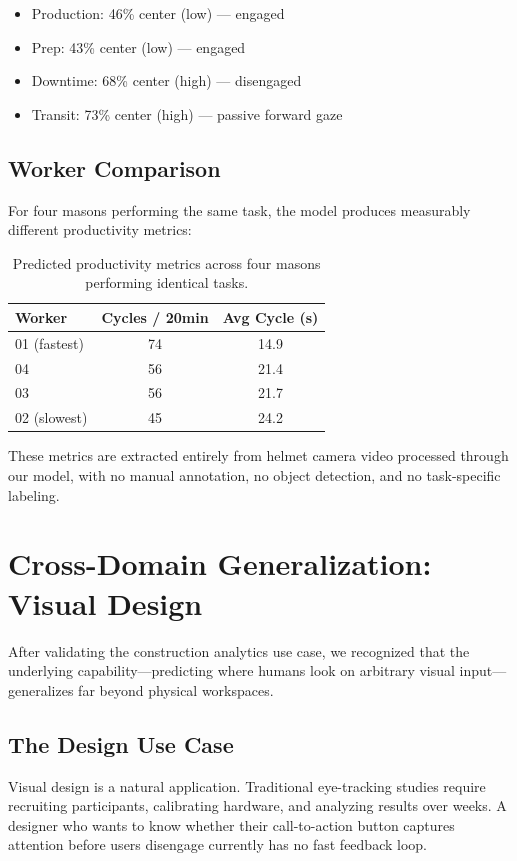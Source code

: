 \documentclass{article}
\begin{document}
\begin{itemize}
    \item Production: 46\% center (low) — engaged
    \item Prep: 43\% center (low) — engaged
    \item Downtime: 68\% center (high) — disengaged
    \item Transit: 73\% center (high) — passive forward gaze
\end{itemize}

\subsection{Worker Comparison}

For four masons performing the same task, the model produces measurably different productivity metrics:

\begin{table}[h]
\centering
\caption{Predicted productivity metrics across four masons performing identical tasks.}
\begin{tabular}{lcc}
\toprule
Worker & Cycles / 20min & Avg Cycle (s) \\
\midrule
01 (fastest) & 74 & 14.9 \\
04 & 56 & 21.4 \\
03 & 56 & 21.7 \\
02 (slowest) & 45 & 24.2 \\
\bottomrule
\end{tabular}
\end{table}

These metrics are extracted entirely from helmet camera video processed through our model, with no manual annotation, no object detection, and no task-specific labeling.

\section{Cross-Domain Generalization: Visual Design}

After validating the construction analytics use case, we recognized that the underlying capability---predicting where humans look on arbitrary visual input---generalizes far beyond physical workspaces.

\subsection{The Design Use Case}

Visual design is a natural application. Traditional eye-tracking studies require recruiting participants, calibrating hardware, and analyzing results over weeks. A designer who wants to know whether their call-to-action button captures attention before users disengage currently has no fast feedback loop.
\end{document}
